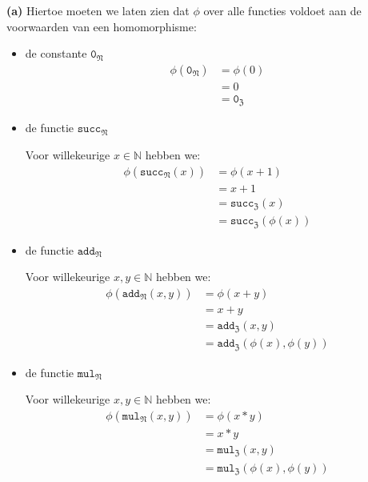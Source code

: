 \documentclass[a4paper,11pt]{article}
\begin{document}
\begin{description}

\item{\bf (a)}
Hiertoe moeten we laten zien dat $\phi$ over alle functies voldoet aan de
voorwaarden van een homomorphisme:

\begin{itemize}

\item{de constante $\texttt{0}_{\mathfrak{N}}$}
  \begin{align*}
    \phi(\texttt{0}_{\mathfrak{N}}) &= \phi(0) \\
                                    &= 0 \\
                                    &= \texttt{0}_{\mathfrak{Z}}
  \end{align*}

\item{de functie $\texttt{succ}_{\mathfrak{N}}$}

  Voor willekeurige $x \in \mathbb{N}$ hebben we:
  \begin{align*}
    \phi(\texttt{succ}_{\mathfrak{N}}(x)) &= \phi(x+1) \\
                                          &= x+1 \\
                                          &= \texttt{succ}_{\mathfrak{Z}}(x) \\
                                          &= \texttt{succ}_{\mathfrak{Z}}(\phi(x))
  \end{align*}

\item{de functie $\texttt{add}_{\mathfrak{N}}$}

  Voor willekeurige $x,y \in \mathbb{N}$ hebben we:
  \begin{align*}
    \phi(\texttt{add}_{\mathfrak{N}}(x,y)) &= \phi(x+y) \\
                                           &= x+y \\
                                           &= \texttt{add}_{\mathfrak{Z}}(x,y) \\
                                           &= \texttt{add}_{\mathfrak{Z}}(\phi(x),\phi(y))
  \end{align*}

\item{de functie $\texttt{mul}_{\mathfrak{N}}$}

  Voor willekeurige $x,y \in \mathbb{N}$ hebben we:
  \begin{align*}
    \phi(\texttt{mul}_{\mathfrak{N}}(x,y)) &= \phi(x*y) \\
                                           &= x*y \\
                                           &= \texttt{mul}_{\mathfrak{Z}}(x,y) \\
                                           &= \texttt{mul}_{\mathfrak{Z}}(\phi(x),\phi(y))
  \end{align*}


\end{itemize}
\end{description}
\end{document}
